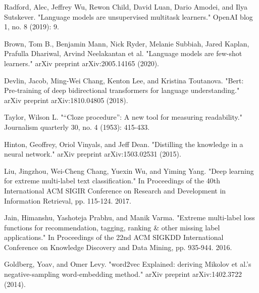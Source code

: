 \documentclass[11pt,dvipsnames]{article}
\begin{document}
\begin{thebibliography}{10}
Radford, Alec, Jeffrey Wu, Rewon Child, David Luan, Dario Amodei, and Ilya Sutskever. "Language models are unsupervised multitask learners." OpenAI blog 1, no. 8 (2019): 9.

Brown, Tom B., Benjamin Mann, Nick Ryder, Melanie Subbiah, Jared Kaplan, Prafulla Dhariwal, Arvind Neelakantan et al. "Language models are few-shot learners." arXiv preprint arXiv:2005.14165 (2020).

Devlin, Jacob, Ming-Wei Chang, Kenton Lee, and Kristina Toutanova. "Bert: Pre-training of deep bidirectional transformers for language understanding." arXiv preprint arXiv:1810.04805 (2018).

Taylor, Wilson L. "“Cloze procedure”: A new tool for measuring readability." Journalism quarterly 30, no. 4 (1953): 415-433.

Hinton, Geoffrey, Oriol Vinyals, and Jeff Dean. "Distilling the knowledge in a neural network." arXiv preprint arXiv:1503.02531 (2015).

Liu, Jingzhou, Wei-Cheng Chang, Yuexin Wu, and Yiming Yang. "Deep learning for extreme multi-label text classification." In Proceedings of the 40th International ACM SIGIR Conference on Research and Development in Information Retrieval, pp. 115-124. 2017.

Jain, Himanshu, Yashoteja Prabhu, and Manik Varma. "Extreme multi-label loss functions for recommendation, tagging, ranking \& other missing label applications." In Proceedings of the 22nd ACM SIGKDD International Conference on Knowledge Discovery and Data Mining, pp. 935-944. 2016.

Goldberg, Yoav, and Omer Levy. "word2vec Explained: deriving Mikolov et al.'s negative-sampling word-embedding method." arXiv preprint arXiv:1402.3722 (2014).

\end{thebibliography}
\end{document}
